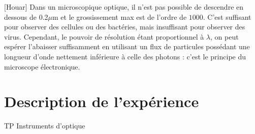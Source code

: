 \documentclass[11pt]{report}
\numberwithin{figure}{section}
\numberwithin{equation}{section}
\numberwithin{table}{section}
\newcommand{\1}{\boldsymbol{1}}
\begin{document}
[Houar] Dans un microscopique optique, il n'est pas possible de descendre en dessous de 0.2$\mu$m et le grossissement max est de l'ordre de $1000$. C'est suffisant pour observer des cellules ou des bactéries, mais insuffisant pour observer des virus. Cependant, le pouvoir de résolution étant proportionnel à $\lambda$, on peut espérer l'abaisser suffisamment en utilisant un flux de particules possédant une longueur d'onde nettement inférieure à celle des photons : c'est le principe du microscope électronique.



\section*{Description de l'expérience}

\textcolor{mycolor5}{TP Instruments d'optique}
\end{document}
